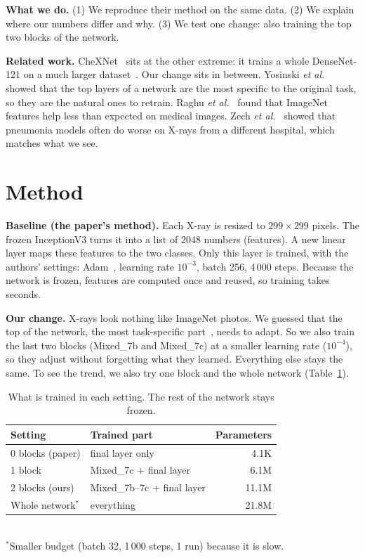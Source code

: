 \documentclass[conference]{IEEEtran}
\begin{document}
\textbf{What we do.} (1) We reproduce their method on the same data. (2) We explain where our numbers differ and why. (3) We test one change: also training the top two blocks of the network.

\textbf{Related work.} CheXNet~\cite{chexnet} sits at the other extreme: it trains a whole DenseNet-121 on a much larger dataset~\cite{chestxray8}. Our change sits in between. Yosinski \emph{et al.}~\cite{yosinski} showed that the top layers of a network are the most specific to the original task, so they are the natural ones to retrain. Raghu \emph{et al.}~\cite{raghu} found that ImageNet features help less than expected on medical images. Zech \emph{et al.}~\cite{zech} showed that pneumonia models often do worse on X-rays from a different hospital, which matches what we see.

\section{Method}
\textbf{Baseline (the paper's method).} Each X-ray is resized to $299\times299$ pixels. The frozen InceptionV3 turns it into a list of 2048 numbers (features). A new linear layer maps these features to the two classes. Only this layer is trained, with the authors' settings: Adam~\cite{adam}, learning rate $10^{-3}$, batch 256, 4\,000 steps. Because the network is frozen, features are computed once and reused, so training takes seconds.

\textbf{Our change.} X-rays look nothing like ImageNet photos. We guessed that the top of the network, the most task-specific part~\cite{yosinski}, needs to adapt. So we also train the last two blocks (Mixed\_7b and Mixed\_7c) at a smaller learning rate ($10^{-4}$), so they adjust without forgetting what they learned. Everything else stays the same. To see the trend, we also try one block and the whole network (Table~\ref{tab:trainable}).

\begin{table}[t]
\centering
\caption{What is trained in each setting. The rest of the network stays frozen.}
\label{tab:trainable}
\begin{tabular}{@{}llr@{}}
\toprule
Setting & Trained part & Parameters \\
\midrule
0 blocks (paper) & final layer only & 4.1K \\
1 block & Mixed\_7c + final layer & 6.1M \\
2 blocks (ours) & Mixed\_7b--7c + final layer & 11.1M \\
Whole network$^*$ & everything & 21.8M \\
\bottomrule
\end{tabular}\\[2pt]
\footnotesize{$^*$Smaller budget (batch 32, 1\,000 steps, 1 run) because it is slow.}
\end{table}
\end{document}
